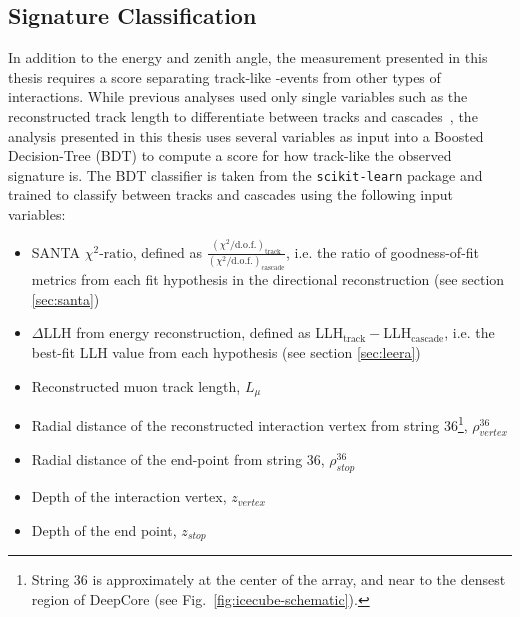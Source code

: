 \subsection{Signature Classification}

In addition to the energy and zenith angle, the measurement presented in this thesis requires a score separating track-like \numucc-events from other types of interactions. While previous analyses used only single variables such as the reconstructed track length to differentiate between tracks and cascades~\cite{deepcore_sterile_2017, Aartsen_2015,IceCube:2019dqi}, the analysis presented in this thesis uses several variables as input into a Boosted Decision-Tree (BDT) to compute a score for how track-like the observed signature is. The BDT classifier is taken from the \texttt{scikit-learn}\cite{scikit-learn} package and trained to classify between tracks and cascades using the following input variables:
\begin{itemize}
    \item SANTA $\chi^2\textrm{-ratio}$, defined as  $\frac{(\chi^{2}/\mathrm{d.o.f.})_{\mathrm{track}}}{(\chi^{2}/\mathrm{d.o.f.})_{\mathrm{cascade}}}$, i.e. the ratio of goodness-of-fit metrics from each fit hypothesis in the directional reconstruction (see section \ref{sec:santa})
    \item $\Delta$LLH from energy reconstruction, defined as LLH$_\mathrm{track}-$LLH$_\mathrm{cascade}$, i.e. the best-fit LLH value from each hypothesis (see section \ref{sec:leera})
    \item Reconstructed muon track length, $L_{\mu}$
    \item Radial distance of the reconstructed interaction vertex from string 36\footnote{String 36 is approximately at the center of the array, and near to the densest region of DeepCore (see Fig.~\ref{fig:icecube-schematic}).}, $\rho^{36}_{vertex}$
    \item Radial distance of the end-point from string 36, $\rho^{36}_{stop}$
    \item Depth of the interaction vertex, $z_{vertex}$
    \item Depth of the end point, $z_{stop}$    
\end{itemize}
